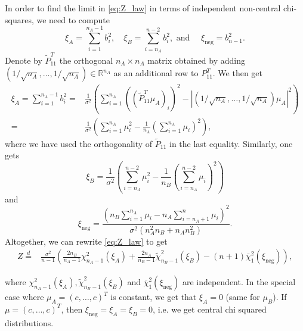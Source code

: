 \documentclass{article}
\theoremstyle{definition}
\theoremstyle{remark}
\newcommand{\R}{\mathbb{R}}  %
\newcommand{\eqdis}{\stackrel{d}{=}}
\begin{document}
In order to find the limit in \eqref{eq:Z_law} in terms of independent non-central chi-squares, we need to compute
$$
	\xi_A = \sum_{i=1}^{n_A -1} b_i^2, \quad \xi_B = \sum_{i=n_A}^{n-2} b_i^2, \text{ and } \quad \xi_{\text{neg}} = b_{n-1}^2.
$$
Denote by $\tilde P_{11}^T$ the orthogonal $n_A \times n_A$ matrix obtained by adding $(1/\sqrt{n_A}, \dots, 1/\sqrt{n_A}) \in \R^{n_A}$  as an additional row to $P_{11}^T$. We then get
\begin{align*}
	\xi_A  = \sum_{i=1}^{n_A -1} b_i^2 =
	  & \frac{1}{\sigma^2} \left(\sum_{i=1}^{n_A} \left(\left(\tilde P_{11}^T \mu_A \right)_i \right)^2 - |(1/\sqrt{n_A}, \dots, 1/\sqrt{n_A}) \mu_A|^2 \right) \\
	= & \frac{1}{\sigma^2} \left(\sum_{i=1}^{n_A} \mu_i^2 - \frac{1}{n_A} \left(\sum_{i=1}^{n_A} \mu_i \right)^2 \right),
\end{align*}
where we have used the orthogonality of $\tilde P_{11}$ in the last equality. Similarly, one gets
$$
	\xi_B = \frac{1}{\sigma^2} \left(\sum_{i=n_A}^{n-2} \mu_i^2 - \frac{1}{n_B} \left(\sum_{i=n_A}^{n-2} \mu_i \right)^2 \right)
$$
and
$$
	\xi_{\text{neg}} = \frac{\left(n_B \sum_{i=1}^{n_A} \mu_i - n_A \sum_{i=n_A + 1}^n \mu_i \right)^2}{\sigma^2\left(n_A^2 n_B + n_A n_B^2\right)}.
$$
Altogether, we can rewrite \eqref{eq:Z_law} to get
\begin{align}\label{eq:Z_law2}
	Z \eqdis
	 & \frac{\sigma^2}{n-1} \left(
	\frac{2 n_B}{n_A -1} \chi^2_{n_A -1}(\xi_A)
	+ \frac{2 n_A}{n_B -1} \tilde \chi^2_{n_B -1}(\xi_B)
	- (n+1) \bar \chi_1^2(\xi_{\text{neg}})
	\right),
\end{align}

where $\chi^2_{n_A -1}(\xi_A), \tilde \chi^2_{n_B -1}(\xi_B)$ and $\bar \chi_1^2(\xi_{\text{neg}})$ are independent.
In the special case where $\mu_A = (c, \dots, c)^T$ is constant, we get that $\xi_A = 0$ (same for $\mu_B$). If $\mu = (c, \dots, c)^T$, then $\xi_{\text{neg}} = \xi_A = \xi_B = 0$, i.e. we get central chi squared distributions.
\end{document}
